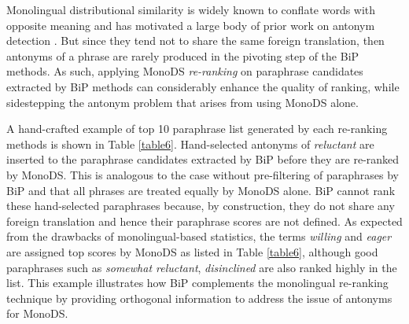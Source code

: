 \documentclass[11pt]{article}
\begin{document}
Monolingual distributional similarity is widely known to conflate words with
opposite meaning and has motivated a large body of prior work on antonym
detection
\cite{Lin01discoveryof,MohammadEtAl08,Mohammad_multiplealternative08,MarneffeFindingcontradictions08,Voorhees08}.
But since they tend not to share the same foreign translation, then antonyms of
a phrase are rarely produced in the pivoting step of the BiP methods. As such,
applying MonoDS \emph{re-ranking} on paraphrase candidates extracted by BiP
methods can considerably enhance the quality of ranking, while sidestepping the
antonym problem that arises from using MonoDS alone.

A hand-crafted example of top 10 paraphrase list generated by each re-ranking methods is shown in Table \ref{table6}. Hand-selected antonyms of \emph{reluctant} are inserted to the paraphrase candidates extracted by BiP before they are re-ranked by MonoDS. This is analogous to the case without pre-filtering of paraphrases by BiP and that all phrases are treated equally by MonoDS alone. BiP cannot rank these hand-selected paraphrases because, by construction, they do not share any foreign translation and hence their paraphrase scores are not defined. As expected from the drawbacks of monolingual-based statistics, the terms \emph{willing} and \emph{eager} are assigned top scores by MonoDS as listed in Table \ref{table6}, although good paraphrases such as \emph{somewhat reluctant}, \emph{disinclined} are also ranked highly in the list. This example illustrates how BiP complements the monolingual re-ranking technique by providing orthogonal information to address the issue of antonyms for MonoDS.

\end{document}
